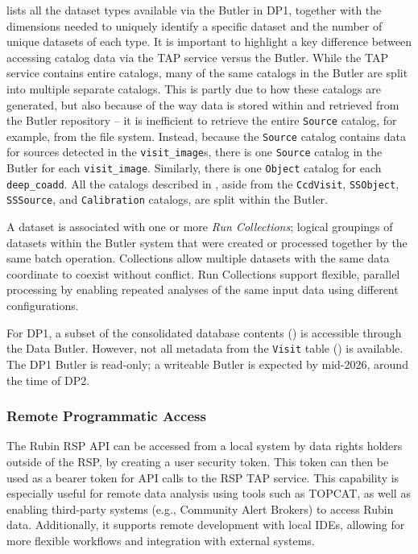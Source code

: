  lists all the dataset types available via the Butler in DP1, together with the dimensions needed to uniquely identify a specific dataset and the number of unique datasets of each type. It is important to highlight a key difference between accessing catalog data via the \gls{TAP} service versus the Butler. While the \gls{TAP} service contains entire catalogs, many of the same catalogs in the Butler are split into multiple separate catalogs. This is partly due to how these catalogs are generated, but also because of the way data is stored within and retrieved from the Butler repository -- it is inefficient to retrieve the entire \texttt{Source} catalog, for example, from the file system. Instead, because the \texttt{Source} catalog contains data for sources detected in the \texttt{visit\_image}s, there is one \texttt{Source} catalog in the Butler for each \texttt{visit\_image}. Similarly, there is one \texttt{Object} catalog for each \texttt{deep\_coadd}. All the catalogs described in , aside from the \texttt{CcdVisit}, \texttt{SSObject}, \texttt{SSSource}, and \texttt{Calibration} catalogs, are split within the Butler.



A dataset is associated with one or more \emph{Run Collections}; logical groupings of  datasets within the \gls{Butler} system that were created or processed together by the same batch operation.
Collections allow multiple datasets with the same data coordinate to coexist without conflict.
Run Collections support flexible, parallel processing by enabling repeated analyses of the same input data using different configurations.

For \gls{DP1}, a subset of the consolidated database contents () is accessible through the Data Butler. However, not all metadata from the \texttt{Visit} table () is available.
The \gls{DP1} Butler is read-only; a writeable Butler is expected by mid-2026, around the time of \gls{DP2}.

\subsubsection{Remote Programmatic Access
\label{sssec:remote_api}}
The Rubin \gls{RSP} \gls{API} can be accessed from a local system by data rights holders outside of the \gls{RSP}, by creating a user security token. This token can then be used as a bearer token for \gls{API} calls to the \gls{RSP} TAP service.
This capability is especially useful for remote data analysis using tools such as \gls{TOPCAT}, as well as enabling third-party systems (e.g., Community Alert Brokers) to access Rubin data. Additionally, it supports remote development with local IDEs, allowing for more flexible workflows and integration with external systems.


